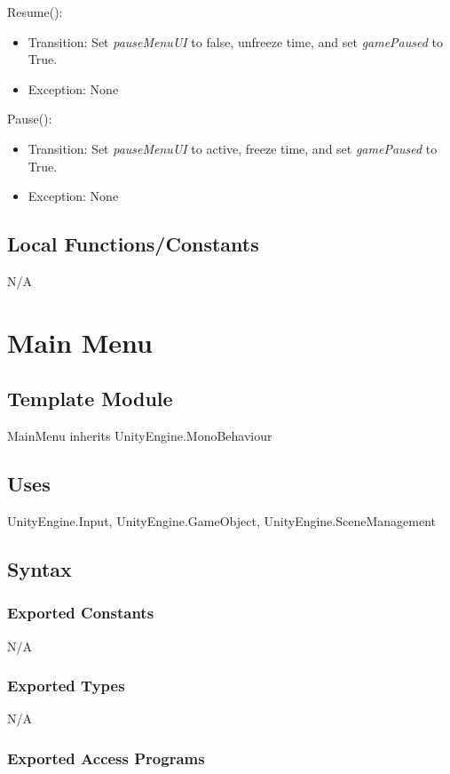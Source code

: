 \documentclass[12pt]{article}
\begin{document}
\noindent Resume():
\begin{itemize}
    \item Transition: Set \textit{pauseMenuUI} to false, unfreeze time, and set \textit{gamePaused} to True.
    \item Exception: None
\end{itemize}

\noindent Pause():
\begin{itemize}
    \item Transition: Set \textit{pauseMenuUI} to active, freeze time, and set \textit{gamePaused} to True.
    \item Exception: None
\end{itemize}


\subsection{Local Functions/Constants}
N/A
\medskip


\newpage

\section{Main Menu}

\subsection{Template Module}
MainMenu inherits UnityEngine.MonoBehaviour

\subsection {Uses}
UnityEngine.Input, UnityEngine.GameObject, UnityEngine.SceneManagement

\subsection {Syntax}

\subsubsection {Exported Constants}
N/A
\subsubsection {Exported Types}
N/A

\subsubsection {Exported Access Programs}
\end{document}
